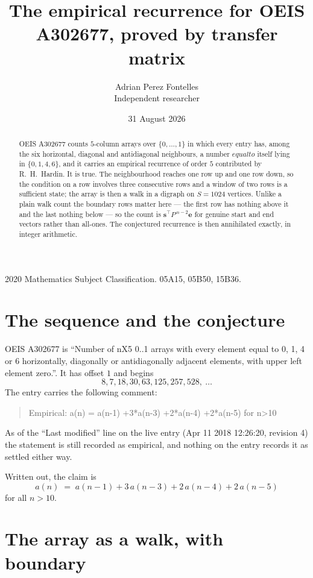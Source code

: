 \documentclass[11pt,a4paper]{article}
\title{The empirical recurrence for OEIS A302677, proved by transfer matrix}
\author{Adrian Perez Fontelles\\ \small Independent researcher}
\date{31 August 2026}
\theoremstyle{plain}
\theoremstyle{definition}
\begin{document}
\maketitle

\begin{abstract}
OEIS A302677 counts $5$-column arrays over $\{0,\dots,1\}$ in which every entry has,
among the six horizontal, diagonal and antidiagonal neighbours, a number $equal to$ itself lying in $\{0,1,4,6\}$, and it carries an empirical
recurrence of order $5$ contributed by R.~H.~Hardin. It is true. The neighbourhood
reaches one row up and one row down, so the condition on a row involves three consecutive
rows and a window of two rows is a sufficient state; the array is then a walk in a digraph
on $S=1024$ vertices. Unlike a plain walk count the boundary rows matter here --- the first
row has nothing above it and the last nothing below --- so the count is
$\mathbf{s}^{\!\top}P^{\,n-2}\mathbf{e}$ for genuine start and end vectors rather than
all-ones. The conjectured recurrence is then annihilated exactly, in integer arithmetic.
\end{abstract}

\noindent\small 2020 Mathematics Subject Classification. 05A15, 05B50, 15B36.\normalsize

\section{The sequence and the conjecture}

OEIS A302677 is ``Number of nX5 0..1 arrays with every element equal to 0, 1, 4 or 6 horizontally, diagonally or antidiagonally adjacent elements, with upper left element zero.''. It has offset
$1$ and begins
\[
8, 7, 18, 30, 63, 125, 257, 528,\ \dots
\]
The entry carries the following comment:
\begin{quote}\small
Empirical: a(n) = a(n-1) +3*a(n-3) +2*a(n-4) +2*a(n-5) for n>10
\end{quote}
As of the ``Last modified'' line on the live entry (Apr 11 2018 12:26:20, revision
4) the statement is still recorded as empirical, and nothing on the entry
records it as settled either way.

Written out, the claim is
\begin{equation}\label{eq:conj}
a(n)\;=\;a(n-1) + 3\,a(n-3) + 2\,a(n-4) + 2\,a(n-5)
\end{equation}
for all $n>10$.

\section{The array as a walk, with boundary}
\end{document}
